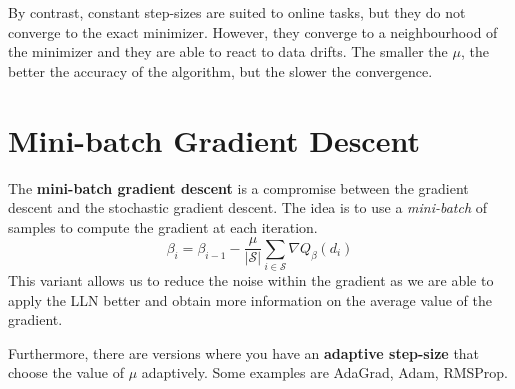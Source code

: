 By contrast, constant step-sizes are suited to online tasks, but they do not converge to the exact minimizer. However, they converge to a neighbourhood of the minimizer and they are able to react to data drifts. The smaller the $\mu$, the better the accuracy of the algorithm, but the slower the convergence.

\section{Mini-batch Gradient Descent}
The \textbf{mini-batch gradient descent} is a compromise between the gradient descent and the stochastic gradient descent. The idea is to use a \textit{mini-batch} of samples to compute the gradient at each iteration.
\[
    \beta_{i} = \beta_{i-1} - \frac{\mu}{|\mathcal S|}\sum_{i\in \mathcal S} \nabla Q_\beta(d_i)
\]
This variant allows us to reduce the noise within the gradient as we are able to apply the LLN better and obtain more information on the average value of the gradient.

Furthermore, there are versions where you have an \textbf{adaptive step-size} that choose the value of $\mu$ adaptively. Some examples are AdaGrad, Adam, RMSProp.